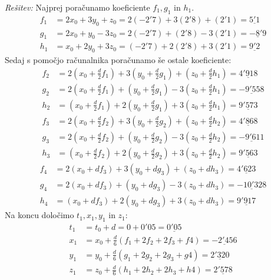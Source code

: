 \documentclass[a4paper, 10pt]{article}
\newenvironment{resitev}{\begin{flushleft}\textit{Rešitev:}}{\hfill\end{flushleft}}
\begin{document}
\begin{resitev}
				Najprej poračunamo koeficiente $f_1, g_1$ in $h_1$. \begin{align*}
					f_1 &= 2x_0 + 3y_0 + z_0 = 2(-2'7) + 3(2'8) + (2'1) = \underline{5'1}\\
					g_1 &= 2x_0 + y_0 - 3z_0 = 2(-2'7) + (2'8) - 3(2'1) = \underline{-8'9}\\
					h_1 &= x_0 + 2y_0 + 3z_0 = (-2'7) + 2(2'8) + 3(2'1) = \underline{9'2}
				\end{align*}
				Sedaj s pomočjo računalnika poračunamo še ostale koeficiente:
				\begin{align*} 
					f_2 &= 2(x_0 + \frac{d}{2}f_1) + 3(y_0 + \frac{d}{2}g_1) + (z_0 + \frac{d}{2}h_1)=\underline{4'918}\\
					g_2 &= 2(x_0 + \frac{d}{2}f_1) + (y_0 + \frac{d}{2}g_1) - 3(z_0 + \frac{d}{2}h_1)=\underline{-9'558}\\
					h_2 &= (x_0 + \frac{d}{2}f_1) + 2(y_0 + \frac{d}{2}g_1) + 3(z_0 + \frac{d}{2}h_1)=\underline{9'573}
				\end{align*} 
				\begin{align*}
					f_3 &= 2(x_0 + \frac{d}{2}f_2) + 3(y_0 + \frac{d}{2}g_2) + (z_0 + \frac{d}{2}h_2)=\underline{4'868}\\
					g_3 &= 2(x_0 + \frac{d}{2}f_2) + (y_0 + \frac{d}{2}g_2) - 3(z_0 + \frac{d}{2}h_2)=\underline{-9'611}\\
					h_3 &= (x_0 + \frac{d}{2}f_2) + 2(y_0 + \frac{d}{2}g_2) + 3(z_0 + \frac{d}{2}h_2)=\underline{9'563}
				\end{align*}
				\begin{align*} 
					f_4 &= 2(x_0 + df_3) + 3(y_0 + dg_3) + (z_0 + dh_3)=\underline{4'623}\\
					g_4 &= 2(x_0 + df_3) + (y_0 + dg_3) - 3(z_0 + dh_3)=\underline{-10'328}\\
					h_4 &= (x_0 + df_3) + 2(y_0 + dg_3) + 3(z_0 + dh_3)=\underline{9'917} 
				\end{align*}
				Na koncu določimo $t_1, x_1, y_1$ in $z_1$: \begin{align*}
					t_1 &= t_0 + d = 0 + 0'05 = \underline{0'05} \\
					x_1 &= x_0 + \frac{d}{6}(f_1 + 2f_2 + 2f_3 + f4)= \underline{-2'456}\\
					y_1 &= y_0 + \frac{d}{6}(g_1 + 2g_2 + 2g_3 + g4)= \underline{2'320} \\
					z_1 &= z_0 + \frac{d}{6}(h_1 + 2h_2 + 2h_3 + h4)= \underline{2'578}
				\end{align*}
			\end{resitev}
			
\end{document}
